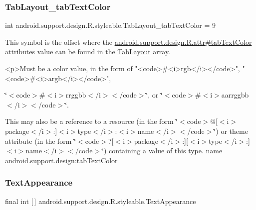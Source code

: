 \subsubsection{\texorpdfstring{Tab\+Layout\+\_\+tab\+Text\+Color}{TabLayout\_tabTextColor}}
{\footnotesize\ttfamily int android.\+support.\+design.\+R.\+styleable.\+Tab\+Layout\+\_\+tab\+Text\+Color = 9\hspace{0.3cm}{\ttfamily [static]}}

This symbol is the offset where the \hyperlink{classandroid_1_1support_1_1design_1_1R_1_1attr_ab79720c0734d6fa212a2e7530837aa6e}{android.\+support.\+design.\+R.\+attr\#tab\+Text\+Color} attribute\textquotesingle{}s value can be found in the \hyperlink{classandroid_1_1support_1_1design_1_1R_1_1styleable_a514b47b47f600f9421b65f4f0aa832d6}{Tab\+Layout} array.

\begin{DoxyVerb}      <p>Must be a color value, in the form of "<code>#<i>rgb</i></code>", "<code>#<i>argb</i></code>",
\end{DoxyVerb}
 \char`\"{}$<$code$>$\#$<$i$>$rrggbb$<$/i$>$$<$/code$>$\char`\"{}, or \char`\"{}$<$code$>$\#$<$i$>$aarrggbb$<$/i$>$$<$/code$>$\char`\"{}. 

This may also be a reference to a resource (in the form \char`\"{}$<$code$>$@\mbox{[}$<$i$>$package$<$/i$>$\+:\mbox{]}$<$i$>$type$<$/i$>$\+:$<$i$>$name$<$/i$>$$<$/code$>$\char`\"{}) or theme attribute (in the form \char`\"{}$<$code$>$?\mbox{[}$<$i$>$package$<$/i$>$\+:\mbox{]}\mbox{[}$<$i$>$type$<$/i$>$\+:\mbox{]}$<$i$>$name$<$/i$>$$<$/code$>$\char`\"{}) containing a value of this type.  name android.\+support.\+design\+:tab\+Text\+Color \mbox{\label{classandroid_1_1support_1_1design_1_1R_1_1styleable_a23dc46ec989f92f528b46568dad7e726}} 
\subsubsection{\texorpdfstring{Text\+Appearance}{TextAppearance}}
{\footnotesize\ttfamily final int \mbox{[}$\,$\mbox{]} android.\+support.\+design.\+R.\+styleable.\+Text\+Appearance\hspace{0.3cm}{\ttfamily [static]}}

